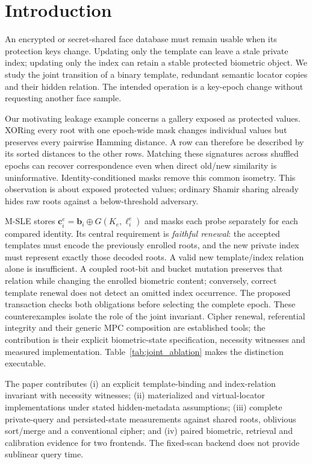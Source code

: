 \documentclass[journal]{IEEEtran}
\newcommand{\MSLE}{\textsc{M-SLE}\xspace}
\begin{document}
\section{Introduction}\label{sec:intro}
An encrypted or secret-shared face database must remain usable when its protection keys change. Updating only the template can leave a stale private index; updating only the index can retain a stable protected biometric object. We study the joint transition of a binary template, redundant semantic locator copies and their hidden relation. The intended operation is a key-epoch change without requesting another face sample.

Our motivating leakage example concerns a gallery exposed as protected values. XORing every root with one epoch-wide mask changes individual values but preserves every pairwise Hamming distance. A row can therefore be described by its sorted distances to the other rows. Matching these signatures across shuffled epochs can recover correspondence even when direct old/new similarity is uninformative. Identity-conditioned masks remove this common isometry. This observation is about exposed protected values; ordinary Shamir sharing already hides raw roots against a below-threshold adversary.

\MSLE stores $\mathbf c_i^e=\mathbf b_i\oplus G(K_e,\ell_i^e)$ and masks each probe separately for each compared identity. Its central requirement is \emph{faithful renewal}: the accepted templates must encode the previously enrolled roots, and the new private index must represent exactly those decoded roots. A valid new template/index relation alone is insufficient. A coupled root-bit and bucket mutation preserves that relation while changing the enrolled biometric content; conversely, correct template renewal does not detect an omitted index occurrence. The proposed transaction checks both obligations before selecting the complete epoch. These counterexamples isolate the role of the joint invariant. Cipher renewal, referential integrity and their generic MPC composition are established tools; the contribution is their explicit biometric-state specification, necessity witnesses and measured implementation. Table~\ref{tab:joint_ablation} makes the distinction executable.

The paper contributes (i) an explicit template-binding and index-relation invariant with necessity witnesses; (ii) materialized and virtual-locator implementations under stated hidden-metadata assumptions; (iii) complete private-query and persisted-state measurements against shared roots, oblivious sort/merge and a conventional cipher; and (iv) paired biometric, retrieval and calibration evidence for two frontends. The fixed-scan backend does not provide sublinear query time.
\end{document}
